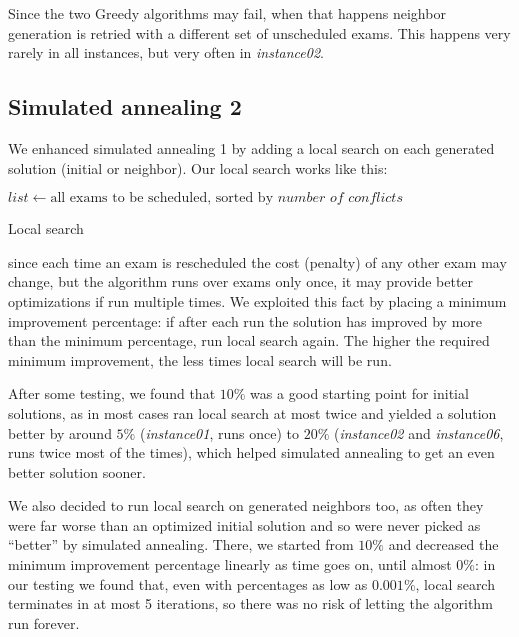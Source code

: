 \documentclass[11pt, a4paper, leqno]{article}
\begin{document}
	Since the two Greedy algorithms may fail, when that happens neighbor generation is retried with a different set of unscheduled exams. This happens very rarely in all instances, but very often in \textit{instance02}.
	
	\subsection{Simulated annealing 2}
	
	We enhanced simulated annealing 1 by adding a local search on each generated solution (initial or neighbor). Our local search works like this:
	
	\begin{algorithm}[H]
		$list \gets \text{all exams to be scheduled, sorted by }\textit{number of conflicts}$\;
		\caption{Local search}
	\end{algorithm}
	
	since each time an exam is rescheduled the cost (penalty) of any other exam may change, but the algorithm runs over exams only once, it may provide better optimizations if run multiple times. We exploited this fact by placing a minimum improvement percentage: if after each run the solution has improved by more than the minimum percentage, run local search again. The higher the required minimum improvement, the less times local search will be run.
	
	After some testing, we found that $10\%$ was a good starting point for initial solutions, as in most cases ran local search at most twice and yielded a solution better by around $5\%$ (\textit{instance01}, runs once) to $20\%$ (\textit{instance02} and \textit{instance06}, runs twice most of the times), which helped simulated annealing to get an even better solution sooner.
	
	We also decided to run local search on generated neighbors too, as often they were far worse than an optimized initial solution and so were never picked as ``better'' by simulated annealing. There, we started from $10\%$ and decreased the minimum improvement percentage linearly as time goes on, until almost $0\%$: in our testing we found that, even with percentages as low as $0.001\%$, local search terminates in at most 5 iterations, so there was no risk of letting the algorithm run forever.
	
\end{document}
